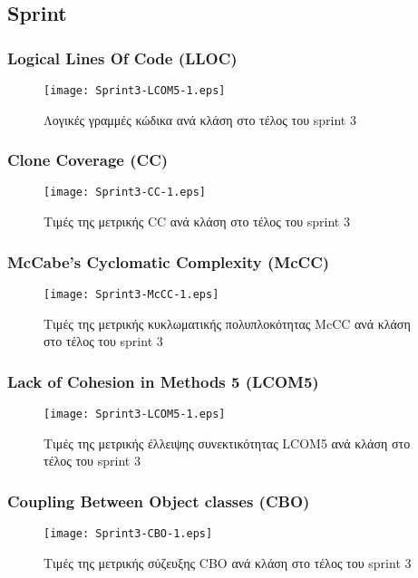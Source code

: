 \subsection{Sprint }

\subsubsection{Logical Lines Of Code (LLOC)}
\label{section:sprint3LLOC}

\begin{figure}
\centering
\texttt{[image: Sprint3-LCOM5-1.eps]}
\caption{Λογικές γραμμές κώδικα ανά κλάση στο τέλος του sprint 3}
\label{fig:sprint3LCOM5}
\end{figure}

\subsubsection{Clone Coverage (CC)}
\label{section:sprint3CC}

\begin{figure}
\centering
\texttt{[image: Sprint3-CC-1.eps]}
\caption{Τιμές της μετρικής CC ανά κλάση στο τέλος του sprint 3}
\label{fig:sprint3CC}
\end{figure}

\subsubsection{McCabe’s Cyclomatic Complexity (McCC)}
\label{section:sprint3McCC}

\begin{figure}
\centering
\texttt{[image: Sprint3-McCC-1.eps]}
\caption{Τιμές της μετρικής κυκλωματικής πολυπλοκότητας McCC ανά κλάση στο τέλος του sprint 3}
\label{fig:sprint3McCC}
\end{figure}

\subsubsection{Lack of Cohesion in Methods 5 (LCOM5)}
\label{section:sprint3LCOM5}

\begin{figure}
\centering
\texttt{[image: Sprint3-LCOM5-1.eps]}
\caption{Τιμές της μετρικής έλλειψης συνεκτικότητας LCOM5 ανά κλάση στο τέλος του sprint 3}
\label{fig:sprint3LCOM5}
\end{figure}

\subsubsection{Coupling Between Object classes (CBO)}
\label{section:sprint3CBO}

\begin{figure}
\centering
\texttt{[image: Sprint3-CBO-1.eps]}
\caption{Τιμές της μετρικής σύζευξης CBO ανά κλάση στο τέλος του sprint 3}
\label{fig:sprint3CBO}
\end{figure}
